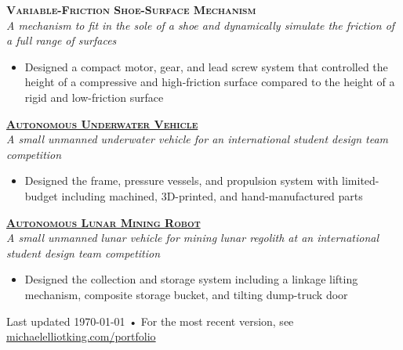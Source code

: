 \documentclass[11pt, letterpaper]{article}
\newcommand{\years}[1]{\marginnote{\footnotesize #1}} %
\begin{document}
  \begin{samepage}
    \years{2013-2014} \textbf{\scshape Variable-Friction Shoe-Surface Mechanism}\\
    \textit{A mechanism to fit in the sole of a shoe and dynamically simulate the friction of a full range of surfaces}
    \begin{itemize}      
      \item Designed a compact motor, gear, and lead screw system that controlled the height of a compressive and high-friction surface compared to the height of a rigid and low-friction surface
    \end{itemize}
  \end{samepage}

  \begin{samepage}
    \years{2013-2014} \textbf{\scshape \href{http://michaelelliotking.com/projects/mcgillrobotics}{Autonomous Underwater Vehicle}}\\
    \textit{A small unmanned underwater vehicle for an international student design team competition}
    \begin{itemize}      
      \item Designed the frame, pressure vessels, and propulsion system with limited-budget including machined, 3D-printed, and hand-manufactured parts
    \end{itemize}
  \end{samepage}

  \begin{samepage}
    \years{2012-2013} \textbf{\scshape \href{http://michaelelliotking.com/projects/lunarex}{Autonomous Lunar Mining Robot}}\\
    \textit{A small unmanned lunar vehicle for mining lunar regolith at an international student design team competition}
    \begin{itemize} 
      \item Designed the collection and storage system including a linkage lifting mechanism, composite storage bucket, and tilting dump-truck door
    \end{itemize}
  \end{samepage}



\begin{center}
{\hspace{-.5in} \scriptsize Last updated \today\- •\- For the most recent version, see \href{http://www.michaelelliotking.com/resume}{michaelelliotking.com/portfolio}}
\end{center}
\end{document}
